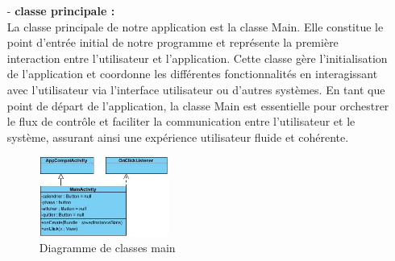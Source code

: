 \begin{itemize} 
\item[-] \textbf{classe principale : }\\
La classe principale de notre application est la classe Main. Elle constitue le point d'entrée initial de notre programme et représente la première interaction entre l'utilisateur et l'application. Cette classe gère l'initialisation de l'application et coordonne les différentes fonctionnalités en interagissant avec l'utilisateur via l'interface utilisateur ou d'autres systèmes. En tant que point de départ de l'application, la classe Main est essentielle pour orchestrer le flux de contrôle et faciliter la communication entre l'utilisateur et le système, assurant ainsi une expérience utilisateur fluide et cohérente.\\	
\begin{figure}[!h]
    	\center
    		\includegraphics[width=0.4\textwidth]{image/diagrame2/Main.jpg}
   		\caption{Diagramme de classes main}
    	\label{Diagramme de classes}
	\end{figure}\\


\end{itemize}
